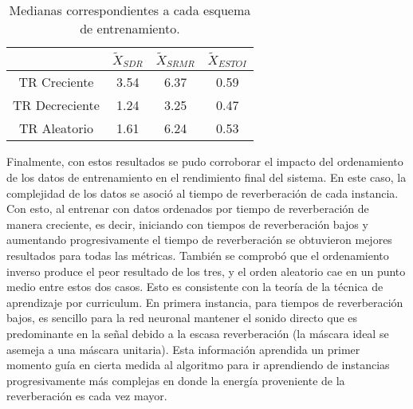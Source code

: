 \begin{table}[H]
\centering
\caption{Medianas correspondientes a cada esquema de entrenamiento.}
\begin{tabular}{|c|c|c|c|}
\hline
               & \textbf{$\tilde{X}_{SDR}$} & \textbf{$\tilde{X}_{SRMR}$} & \textbf{$\tilde{X}_{ESTOI}$} \\ \hline
TR Creciente   & 3.54         & 6.37          & 0.59           \\ \hline
TR Decreciente & 1.24         & 3.25          & 0.47           \\ \hline
TR Aleatorio   & 1.61         & 6.24          & 0.53           \\ \hline
\end{tabular}
\label{table:resultados_reverb}
\end{table}

Finalmente, con estos resultados se pudo corroborar el impacto del ordenamiento de los datos de entrenamiento en el rendimiento final del sistema. En este caso, la complejidad de los datos se asoció al tiempo de reverberación de cada instancia. Con esto, al entrenar con datos ordenados por tiempo de reverberación de manera creciente, es decir, iniciando con tiempos de reverberación bajos y aumentando progresivamente el tiempo de reverberación se obtuvieron mejores resultados para todas las métricas. También se comprobó que el ordenamiento inverso produce el peor resultado de los tres, y el orden aleatorio cae en un punto medio entre estos dos casos. Esto es consistente con la teoría de la técnica de aprendizaje por curriculum. En primera instancia, para tiempos de reverberación bajos, es sencillo para la red neuronal mantener el sonido directo que es predominante en la señal debido a la escasa reverberación (la máscara ideal se asemeja a una máscara unitaria). Esta información aprendida un primer momento guía en cierta medida al algoritmo para ir aprendiendo de instancias progresivamente más complejas en donde la energía proveniente de la reverberación es cada vez mayor. 
